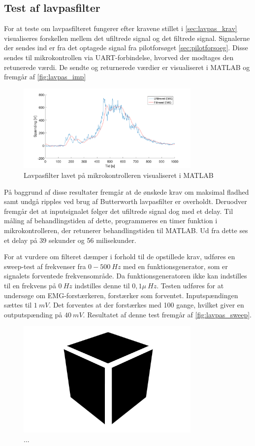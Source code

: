 \subsection{Test af lavpasfilter}
For at teste om lavpasfilteret fungerer efter kravene stillet i \autoref{sec:lavpas_krav} visualiseres forskellen mellem det ufiltrede signal og det filtrede signal. Signalerne der sendes ind er fra det optagede signal fra pilotforsøget \autoref{sec:pilotforsoeg}. Disse sendes til mikrokontrollen via UART-forbindelse, hvorved der modtages den retunerede værdi. De sendte og returnerede værdier er visualiseret i MATLAB og fremgår af \autoref{fig:lavpas_imp}

\begin{figure}[H]
\centering
\includegraphics[width=0.8\textwidth]{figures/EMG_test}
\caption{Lavpasfilter lavet på mikrokontrolleren visualiseret i MATLAB}
\label{fig:lavpas_imp}
\end{figure}

På baggrund af disse resultater fremgår at de ønskede krav om maksimal fladhed samt undgå ripples ved brug af Butterworth lavpasfilter er overholdt. 
Deruodver fremgår det at inputsignalet følger det ufiltrede signal dog med et delay. Til måling af behandlingstiden af dette, programmeres en timer funktion i mikrokontrolleren, der retunerer behandlingstiden til MATLAB. Ud fra dette ses et delay på 39 sekunder og 56 milisekunder.


For at vurdere om filteret dæmper i forhold til de opstillede krav, udføres en sweep-test af frekvenser fra $0-500~Hz$ med en funktionsgenerator, som er signalets forventede frekvensområde. Da funktionsgeneratoren ikke kan indstilles til en frekvens på $0~Hz$ indstilles denne til $0,1 \mu~Hz$. Testen udføres for at undersøge om EMG-forstærkeren, forstærker som forventet. Inputspændingen sættes til $1~mV$. Det forventes at der forstærkes med 100 gange, hvilket giver en outputspænding på $40~mV$. Resultatet af denne test fremgår af \autoref{fig:lavpas_sweep}. 


\begin{figure}[H]
\centering
\includegraphics[width=0.8\textwidth]{figures/Pilotforsoeg/blackbox}
\caption{...}
\label{fig:lavps_sweep}
\end{figure}

